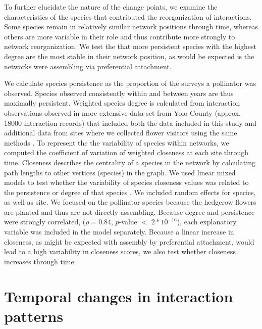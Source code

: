 \documentclass[12pt]{article}
\begin{document}
To further elucidate the nature of the change points, we examine the
characteristics of the species that contributed the reorganization of
interactions. Some species remain in relatively similar network
positions through time, whereas others are more variable in their role
and thus contribute more strongly to network reorganization. We test
the that more persistent species with the highest degree are the most
stable in their network position, as would be expected is the networks
were assembling via preferential attachment.

We calculate species persistence as the proportion of the surveys a
pollinator was observed. Species observed consistently within and
between years are thus maximally persistent. Weighted species degree
is calculated from interaction observations observed in more extensive
data-set from Yolo County (approx.~ 18000 interaction records) that
included both the data included in this study and additional data from
sites where we collected flower visitors using the same methods
\citep{mgonigle-2015-x, ponisio2015farm}.%
To represent the the variability of species within networks, we
computed the coefficient of variation of weighted closeness at each
site through time. Closeness describes the centrality of a species in
the network by calculating path lengths to other vertices (species) in
the graph. We used linear mixed models to test whether the variability
of species closeness values was related to the persistence or degree
of that species \citep{lme4, lmetest}. We included random effects for
species, as well as site. We focused on the pollinator species because
the hedgerow flowers are planted and thus are not directly
assembling. Because degree and persistence were strongly correlated,
($\rho = 0.84$, $p$-value $<$ $2*10^{-16}$), each explanatory variable
was included in the model separately. Because a linear increase in
closeness, as might be expected with assembly by preferential
attachment, would lead to a high variability in closeness scores, we
also test whether closeness increases through time.

\section*{Temporal changes in interaction patterns}
\end{document}
